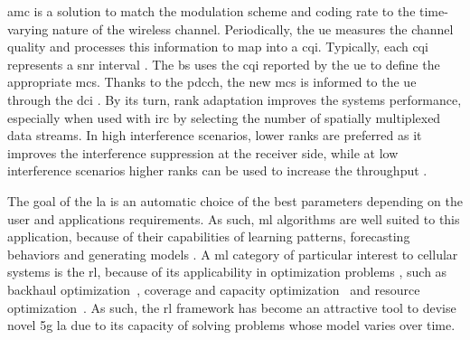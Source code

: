 \Gls{amc} is a solution to match the modulation scheme and coding rate to the time-varying nature of the wireless channel.
%
Periodically, the \gls{ue} measures the channel quality and processes this information to map into a \gls{cqi}.
%
Typically, each \gls{cqi} represents a \gls{snr} interval \cite{Blanquez-Casado2016}.
%
The \gls{bs} uses the \gls{cqi} reported by the \gls{ue} to define the appropriate \gls{mcs}.
%
Thanks to the \gls{pdcch}, the new \gls{mcs} is informed to the \gls{ue} through the \gls{dci} \cite{ErikDahlman5G}.
%
By its turn, rank adaptation improves the systems performance, especially when used with \gls{irc} by selecting the number of spatially multiplexed data streams.
%
In high interference scenarios, lower ranks are preferred as it improves the interference suppression at the receiver side, while at low interference scenarios higher ranks can be used to increase the throughput \cite{catania2015distributed}.
%

The goal of the \gls{la} is an automatic choice of the best parameters depending on the user and applications requirements.
%
As such, \gls{ml} algorithms are well suited to this application, because of their capabilities of learning patterns, forecasting behaviors and generating models \cite{survey-son}.
%
A \gls{ml} category of particular interest to cellular systems is the \gls{rl}, because of its applicability in optimization problems \cite{survey-son}, such as backhaul optimization~\cite{jaber2015}, coverage and capacity optimization~\cite{Fan2014} and resource optimization~\cite{Miozzo2017SwitchOnOffPF}.
%
As such, the \gls{rl} framework has become an attractive tool to devise novel \gls{5g} \gls{la} due to its capacity of solving problems whose model varies over time.
%
%
%

